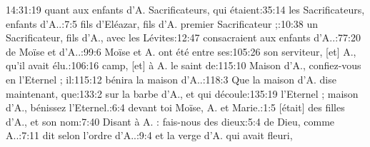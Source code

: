 \begin{multicols}{3}
{14:31:19	quant aux enfants d'A. Sacrificateurs, qui étaient:35:14	les Sacrificateurs, enfants d'A..:7:5	fils d'Eléazar, fils d'A. premier Sacrificateur ;:10:38	un Sacrificateur, fils d'A., avec les Lévites:12:47	consacraient aux enfants d'A..:77:20	de Moïse et d'A..:99:6	Moïse et A. ont été entre ses:105:26	son serviteur, [et] A., qu'il avait élu.:106:16	camp, [et] à A. le saint de:115:10	Maison d'A., confiez-vous en l'Eternel ; il:115:12	bénira la maison d'A..:118:3	Que la maison d'A. dise maintenant, que:133:2	sur la barbe d'A., et qui découle:135:19	l'Eternel ; maison d'A., bénissez l'Eternel.:6:4	devant toi Moïse, A. et Marie.:1:5	[était] des filles d'A., et son nom:7:40	Disant à A. : fais-nous des dieux:5:4	de Dieu, comme A..:7:11	dit selon l'ordre d'A..:9:4	et la verge d'A. qui avait fleuri,\newline

}

\end{multicols}
